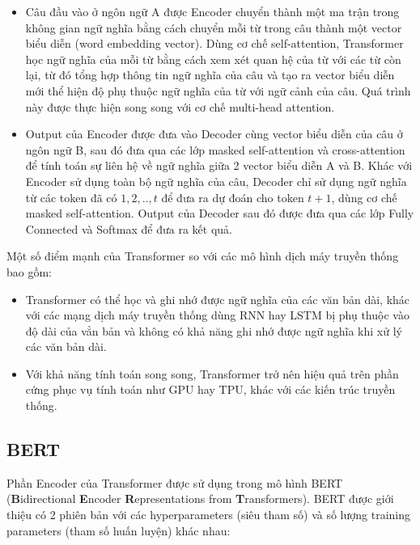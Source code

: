 \begin{itemize}
\item Câu đầu vào ở ngôn ngữ A được Encoder chuyển thành một ma trận trong không gian ngữ nghĩa bằng cách chuyển mỗi từ trong câu thành một vector biểu diễn (word embedding vector). Dùng cơ chế self-attention, Transformer học ngữ nghĩa của mỗi từ bằng cách xem xét quan hệ của từ với các từ còn lại, từ đó tổng hợp thông tin ngữ nghĩa của câu và tạo ra vector biểu diễn mới thể hiện độ phụ thuộc ngữ nghĩa của từ với ngữ cảnh của câu. Quá trình này được thực hiện song song với cơ chế multi-head attention.
\item Output của Encoder được đưa vào Decoder cùng vector biểu diễn của câu ở ngôn ngữ B, sau đó đưa qua các lớp masked self-attention và cross-attention để tính toán sự liên hệ về ngữ nghĩa giữa 2 vector biểu diễn A và B. Khác với Encoder sử dụng toàn bộ ngữ nghĩa của câu, Decoder chỉ sử dụng ngữ nghĩa từ các token đã có $1, 2, .., t$ để đưa ra dự đoán cho token $t + 1$, dùng cơ chế masked self-attention. Output của Decoder sau đó được đưa qua các lớp Fully Connected và Softmax để đưa ra kết quả.
\end{itemize}
Một số điểm mạnh của Transformer so với các mô hình dịch máy truyền thống bao gồm:
\begin{itemize}
\item Transformer có thể học và ghi nhớ được ngữ nghĩa của các văn bản dài, khác với các mạng dịch máy truyền thống dùng RNN hay LSTM bị phụ thuộc vào độ dài của vẳn bản và không có khả năng ghi nhớ được ngữ nghĩa khi xử lý các văn bản dài.
\item Với khả năng tính toán song song, Transformer trở nên hiệu quả trên phần cứng phục vụ tính toán như GPU hay TPU, khác với các kiến trúc truyền thống.
\end{itemize}

\subsection{BERT}
Phần Encoder của Transformer được sử dụng trong mô hình BERT (\textbf{B}idirectional \textbf{E}ncoder \textbf{R}epresentations from \textbf{T}ransformers)\cite{devlin-etal-2019-bert}. BERT được giới thiệu có 2 phiên bản với các hyperparameters (siêu tham số) và số lượng training parameters (tham số huấn luyện) khác nhau:

